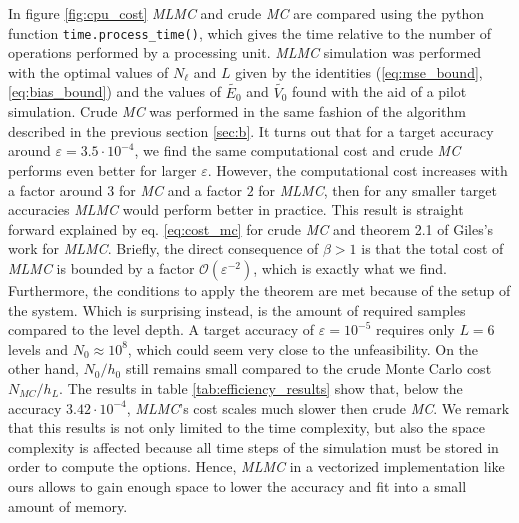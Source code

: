 In figure \ref{fig:cpu_cost} \textit{MLMC} and crude \textit{MC} are compared using the python function \texttt{time.process\_time()}, which gives the time relative to the number of operations performed by a processing unit. \textit{MLMC} simulation was performed with the optimal values of $N_\ell$ and $L$ given by the identities (\ref{eq:mse_bound},  \ref{eq:bias_bound}) and the values of $\tilde{E_0}$ and $\tilde{V_0}$ found with the aid of a pilot simulation.
Crude \textit{MC} was performed in the same fashion of the algorithm described in the previous section \ref{sec:b}.
It turns out that for a target accuracy around $\varepsilon = 3.5 \cdot 10^{-4}$, we find the same computational cost and crude \textit{MC} performs even better for larger $\varepsilon$. However, the computational cost increases with a factor around $3$ for \textit{MC} and a factor $2$ for \textit{MLMC}, then for any smaller target accuracies \textit{MLMC} would perform better in practice. This result is straight forward explained by eq. \ref{eq:cost_mc} for crude \textit{MC} and theorem 2.1 of Giles's work \cite{giles_2015} for \textit{MLMC}. 
Briefly, the direct consequence of $\beta > 1$ is that the total cost of \textit{MLMC} is bounded by a factor $\mathcal{O}(\varepsilon^{-2})$, which is exactly what we find. Furthermore, the conditions to apply the theorem are met because of the setup of the system.  
Which is surprising instead, is the amount of required samples compared to the level depth. A target accuracy of $\varepsilon = 10^{-5}$ requires only $L = 6$ levels and $N_0 \approx 10^8$, which could seem very close to the unfeasibility. 
On the other hand, $N_0 / h_0$ still remains small compared to the crude Monte Carlo cost $N_{MC} / h_L$. The results in table \ref{tab:efficiency_results} show that, below the accuracy $3.42 \cdot 10^{-4}$, \textit{MLMC}'s cost scales much slower then crude \textit{MC}. We remark that this results is not only limited to the time complexity, but also the space complexity is affected because all time steps of the simulation must be stored in order to compute the options. Hence, \textit{MLMC} in a vectorized implementation like ours allows to gain enough space to lower the accuracy and fit into a small amount of memory.

